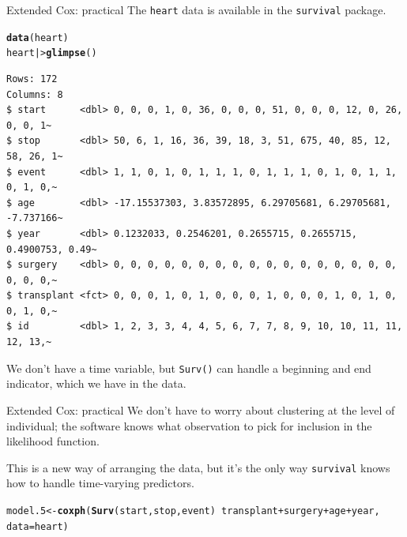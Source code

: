 \documentclass[12pt,english,pdf,xcolor=dvipsnames,aspectratio=169,handout]{beamer}\usepackage[]{graphicx}\usepackage[]{xcolor}
\makeatletter
\newcommand{\hlopt}[1]{\textcolor[rgb]{0,0,0}{#1}}%
\newcommand{\hlstd}[1]{\textcolor[rgb]{0.345,0.345,0.345}{#1}}%
\newcommand{\hlkwb}[1]{\textcolor[rgb]{0.69,0.353,0.396}{#1}}%
\newcommand{\hlkwc}[1]{\textcolor[rgb]{0.333,0.667,0.333}{#1}}%
\newcommand{\hlkwd}[1]{\textcolor[rgb]{0.737,0.353,0.396}{\textbf{#1}}}%
\newenvironment{kframe}{%
 \def\at@end@of@kframe{}%
 \ifinner\ifhmode%
  \def\at@end@of@kframe{\end{minipage}}%
  \begin{minipage}{\columnwidth}%
 \fi\fi%
 \def\FrameCommand##1{\hskip\@totalleftmargin \hskip-\fboxsep
 \colorbox{shadecolor}{##1}\hskip-\fboxsep
     \hskip-\linewidth \hskip-\@totalleftmargin \hskip\columnwidth}%
 \MakeFramed {\advance\hsize-\width
   \@totalleftmargin\z@ \linewidth\hsize
   \@setminipage}}%
 {\par\unskip\endMakeFramed%
 \at@end@of@kframe}
\newenvironment{knitrout}{}{} %
\makeatother
\begin{document}
\begin{frame}[fragile]{Extended Cox: practical}
The \texttt{heart} data is available in the \texttt{survival} package.\bigskip

\begin{knitrout}\scriptsize
{}\color{fgcolor}\begin{kframe}
\begin{alltt}
\hlkwd{data}\hlstd{(heart)}
\hlstd{heart |>} \hlkwd{glimpse}\hlstd{()}
\end{alltt}
\begin{verbatim}
Rows: 172
Columns: 8
$ start      <dbl> 0, 0, 0, 1, 0, 36, 0, 0, 0, 51, 0, 0, 0, 12, 0, 26, 0, 0, 1~
$ stop       <dbl> 50, 6, 1, 16, 36, 39, 18, 3, 51, 675, 40, 85, 12, 58, 26, 1~
$ event      <dbl> 1, 1, 0, 1, 0, 1, 1, 1, 0, 1, 1, 1, 0, 1, 0, 1, 1, 0, 1, 0,~
$ age        <dbl> -17.15537303, 3.83572895, 6.29705681, 6.29705681, -7.737166~
$ year       <dbl> 0.1232033, 0.2546201, 0.2655715, 0.2655715, 0.4900753, 0.49~
$ surgery    <dbl> 0, 0, 0, 0, 0, 0, 0, 0, 0, 0, 0, 0, 0, 0, 0, 0, 0, 0, 0, 0,~
$ transplant <fct> 0, 0, 0, 1, 0, 1, 0, 0, 0, 1, 0, 0, 0, 1, 0, 1, 0, 0, 1, 0,~
$ id         <dbl> 1, 2, 3, 3, 4, 4, 5, 6, 7, 7, 8, 9, 10, 10, 11, 11, 12, 13,~
\end{verbatim}
\end{kframe}
\end{knitrout}

We don't have a time variable, but \texttt{Surv()} can handle a beginning and end indicator, which we have in the data.
\end{frame}




\begin{frame}[fragile]{Extended Cox: practical}
We don't have to worry about clustering at the level of individual; the software knows what observation to pick for inclusion in the likelihood function.\bigskip

This is a new way of arranging the data, but it's the only way \texttt{survival} knows how to handle time-varying predictors.\bigskip

\begin{knitrout}\scriptsize
{}\color{fgcolor}\begin{kframe}
\begin{alltt}
\hlstd{model.5} \hlkwb{<-} \hlkwd{coxph}\hlstd{(}\hlkwd{Surv}\hlstd{(start, stop, event)} \hlopt{~} \hlstd{transplant} \hlopt{+} \hlstd{surgery} \hlopt{+} \hlstd{age} \hlopt{+} \hlstd{year,}
                 \hlkwc{data} \hlstd{= heart)}
\end{alltt}
\end{kframe}
\end{knitrout}
\end{frame}
\end{document}
